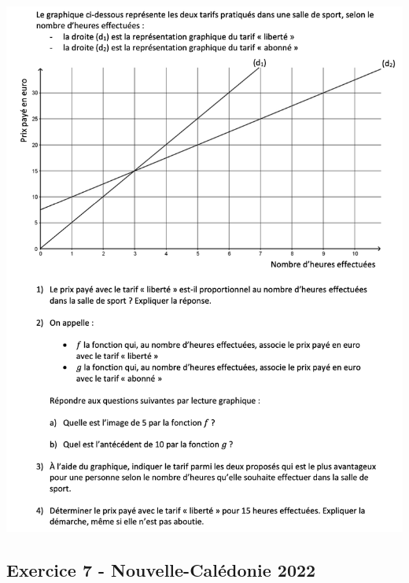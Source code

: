 \documentclass[14 pt, fleqn]{extarticle}
\theoremstyle{plain}
\begin{document}
\includegraphics[width = 20 cm]{Ex6}


\subsection*{Exercice 7 - Nouvelle-Calédonie 2022}	
\end{document}

